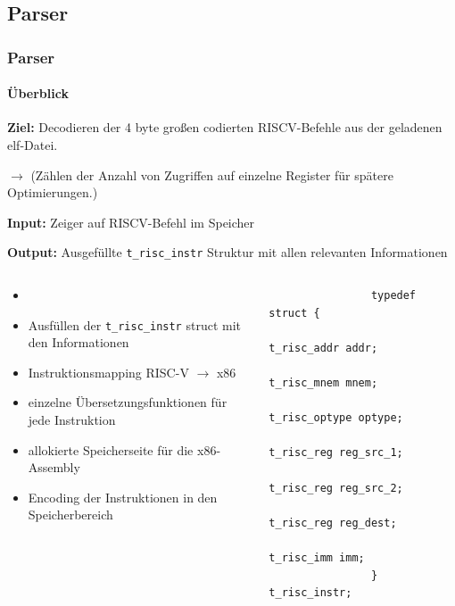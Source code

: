 \documentclass[german]{tum-presentation}
\newcommand{\refer}[0]{\ensuremath{\rightarrow} }
\begin{document}
\subsection{Parser} %
\begin{frame}[fragile]
	\frametitle{Parser}
	\framesubtitle{Überblick}
	\textbf{Ziel:} Decodieren der 4 byte großen codierten RISCV-Befehle aus der geladenen elf-Datei.

	\refer (Zählen der Anzahl von Zugriffen auf einzelne Register für spätere Optimierungen.)

	\vspace{0.25cm}
	\textbf{Input:} Zeiger auf RISCV-Befehl im Speicher

	\textbf{Output:} Ausgefüllte \verb!t_risc_instr! Struktur mit allen relevanten Informationen

	\begin{columns}
		\begin{column}{0.5\textwidth}
			\vspace{0.25cm}
			\begin{itemize}
				\item
				\item Ausfüllen der \verb!t_risc_instr! struct mit den Informationen
				\item Instruktionsmapping RISC-V \refer x86
				\item einzelne Übersetzungsfunktionen für jede Instruktion

				\vspace{1cm}

				\item allokierte Speicherseite für die x86-Assembly
				\item Encoding der Instruktionen in den Speicherbereich
			\end{itemize}
		\end{column}

		\begin{column}{0.5\textwidth}
			\begin{lstlisting}
				typedef struct {
				    t_risc_addr addr;
				    t_risc_mnem mnem;
				    t_risc_optype optype;
				    t_risc_reg reg_src_1;
				    t_risc_reg reg_src_2;
				    t_risc_reg reg_dest;
				    t_risc_imm imm;
				} t_risc_instr;
			\end{lstlisting}
		\end{column}
	\end{columns}


\end{frame}
\end{document}
